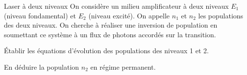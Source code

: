 \begin{exo}[PC][1][colle]{Laser à deux niveaux}
  On considère un milieu amplificateur à deux niveaux $E_1$ (niveau fondamental) et $E_2$ (niveau excité). On appelle $n_1$ et $n_2$ les populations des deux niveaux. On cherche à réaliser une inversion de population en soumettant ce système à un flux de photons accordés sur la transition. 
\begin{quest}
  \item	
  Établir les équations d'évolution des populations des niveaux 1 et 2.
  \item 
  En déduire la population $n_2$ en régime permanent. 
\end{quest}
\end{exo}
